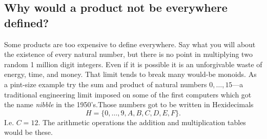 \documentclass[12pt,twoside,letterpaper]{memoir}
\begin{document}
\subsection{Why would a product not be everywhere defined?}

Some products are too expensive to define everywhere.  Say what you 
will about the existence of every natural number, but there is no point 
in multiplying two random 1 million digit integers.  Even if it is possible 
it is an unforgivable waste of energy, time, and money.  That limit tends to 
break many would-be monoids.  As a pint-size example try the sum and product of
natural numbers $0,\ldots, 15$---a traditional engineering limit imposed 
on some of the first computers which got the name \emph{nibble} in the 1950's.Those numbers got to be written in Hexidecimals
\[
    H=\{0,\ldots,9,A,B,C,D,E,F\}.
\]
I.e. $C=12$.
The arithmetic operations the addition and multiplication tables would be these.
\end{document}
